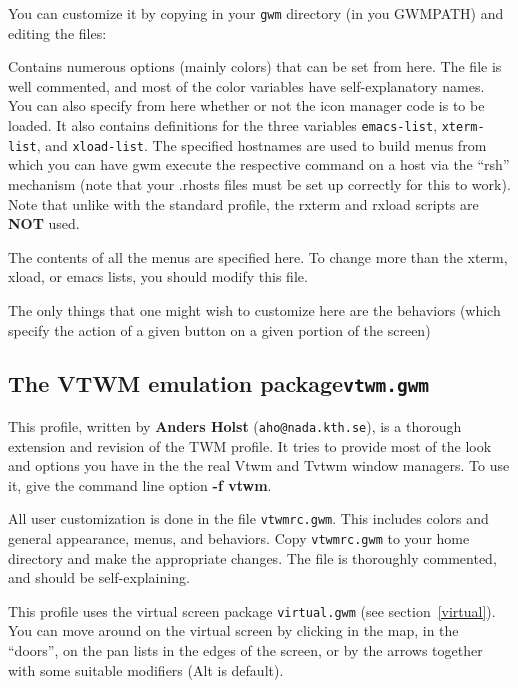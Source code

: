 You can customize it by copying in your \verb"gwm"
directory (in you GWMPATH) and editing the files:

\begin{description}

 Contains numerous options (mainly colors) that can be
set from here. The file is well commented, and most of the color
variables have self-explanatory names. You can also specify from here
whether or not the icon manager code is to be loaded.
It also contains definitions for the three variables
\verb"emacs-list", \verb"xterm-list", and \verb"xload-list". 
The specified hostnames are
used to build menus from which you can have gwm execute the respective
command on a host via the ``rsh'' mechanism (note that your .rhosts
files must be set up correctly for this to work). Note that unlike
with the standard profile, the rxterm and rxload scripts are {\bf NOT}
used.

 The contents of all the menus are specified
here. To change more than the xterm, xload, or emacs lists, you should
modify this file.

 The only things that one might wish to customize here are the
behaviors (which specify the action of a given button on a given
portion of the screen)
\end{description}

\subsection{The VTWM emulation package\hfill{\tt vtwm.gwm}}

This profile, written by {\bf Anders Holst} (\verb"aho@nada.kth.se"),
is a thorough extension and revision of the TWM profile. It tries to
provide most of the look and options you have in the the real {\sc
Vtwm} and {\sc Tvtwm} window managers. To use it, give the command
line option {\bf -f vtwm}.

All user customization is done in the file {\tt vtwmrc.gwm}. This
includes colors and general appearance, menus, and behaviors. Copy
{\tt vtwmrc.gwm} to your home directory and make the appropriate
changes. The file is thoroughly commented, and should be
self-explaining.

This profile uses the virtual screen package {\tt virtual.gwm} (see
section~\ref{virtual}). You can move around on the virtual screen by
clicking in the map, in the ``doors'', on the pan lists in the edges
of the screen, or by the arrows together with some suitable modifiers
({\sc Alt} is default). 


